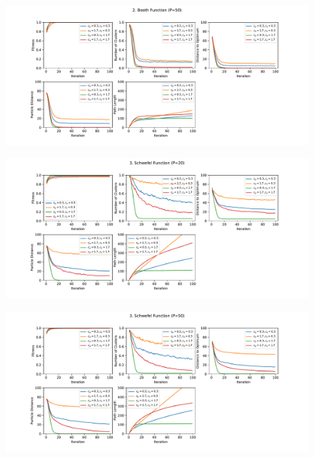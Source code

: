 \documentclass[12pt]{article}
\begin{document}
\begin{figure}
	\centering
	\includegraphics[width=1\textwidth]{figures/ex4/ex4-2-50.pdf}
	\label{fig:ex4-2-50}
\end{figure}
\begin{figure}
	\centering
	\includegraphics[width=1\textwidth]{figures/ex4/ex4-3-20.pdf}
	\label{fig:ex4-3-20}
\end{figure}
\begin{figure}
	\centering
	\includegraphics[width=1\textwidth]{figures/ex4/ex4-3-50.pdf}
	\label{fig:ex4-3-50}
\end{figure}
\end{document}

